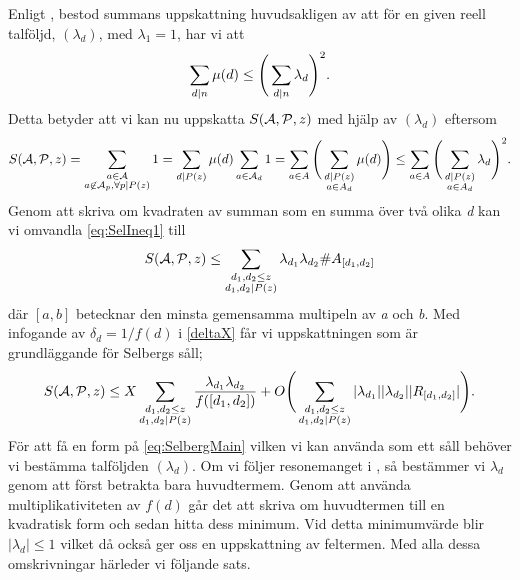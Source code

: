 Enligt \cite{cojocarumurty}, bestod summans uppskattning huvudsakligen av att för en given reell talföljd, \((\lambda_d)\), med \(\lambda_1 = 1\), har vi att 
\begin{equation}
    \sum_{d\divides n}\mu(d) \leq \Bigg(\sum_{d\divides n}\lambda_d\Bigg)^2.\nonumber
\end{equation}
Detta betyder att vi kan nu uppskatta \(\S{A}{P}{z}\) med hjälp av \((\lambda_d)\) eftersom
\begin{equation}
\S{A}{P}{z} = \sum_{\substack{a\in \mathcal{A}\\a\not\in\mathcal{A}_p,\forall p\divides P(z)}} 1 = \sum_{d\divides P(z)} \mu(d) \sum_{a\in\mathcal{A}_d}1 = \sum_{a\in A} \Bigg(\sum_{\substack{d\divides P(z)\\a\in A_d}}\mu(d)\Bigg)\leq \sum_{a\in A}\Bigg(\sum_{\substack{d\divides P(z)\\a\in A_d}}\lambda_d\Bigg)^2.\label{eq:SelIneq1}
\end{equation}
Genom att skriva om kvadraten av summan som en summa över två olika \textit{d} kan vi omvandla \eqref{eq:SelIneq1} till
\begin{equation}
    \S{A}{P}{z} \leq \sum_{\substack{d_1,d_2\leq z\\d_1,d_2\divides P(z)}}\lambda_{d_1}\lambda_{d_2}\#A_{[d_1, d_2]}\nonumber
\end{equation}
där \([a, b]\) betecknar den minsta gemensamma multipeln av \textit{a} och \textit{b}. Med infogande av \(\delta_d = 1/f(d)\) i \eqref{deltaX} får vi uppskattningen som är grundläggande för Selbergs såll;
\begin{equation}
    \S{A}{P}{z} \leq X\sum_{\substack{d_1,d_2\leq z\\d_1,d_2\divides P(z)}}\frac{\lambda_{d_1}\lambda_{d_2}}{f([d_1,d_2])} + O\Bigg(\sum_{\substack{d_1,d_2\leq z\\d_1,d_2\divides P(z)}}|\lambda_{d_1}||\lambda_{d_2}||R_{[d_1, d_2]}|\Bigg)\label{eq:SelbergMain}.
\end{equation}
För att få en form på \eqref{eq:SelbergMain} vilken vi kan använda som ett såll behöver vi bestämma talföljden \((\lambda_d)\). Om vi följer resonemanget i \cite{cojocarumurty}, så bestämmer vi \(\lambda_d\) genom att först betrakta bara huvudtermem. Genom att använda multiplikativiteten av \(f(d)\) går det att skriva om huvudtermen till en kvadratisk form och sedan hitta dess minimum. Vid detta minimumvärde blir \(|\lambda_d|\leq 1\) vilket då också ger oss en uppskattning av feltermen. Med alla dessa omskrivningar härleder vi följande sats.

